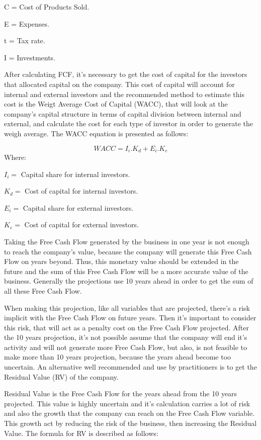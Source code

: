 \documentclass[
  11pt,
  a4paper,
]{article}
\begin{document}
C = Cost of Products Sold.

E = Expenses.

t = Tax rate.

I = Investments.

After calculating FCF, it's necessary to get the cost of capital for the investors that allocated capital on the company. This cost of capital will account for internal and external investors and the recommended method to estimate this cost is the Weigt Average Cost of Capital (WACC), that will look at the company's capital structure in terms of capital division between internal and external, and calculate the cost for each type of investor in order to generate the weigh average. The WACC equation is presented as follows:

\[WACC = I_i.K_d + E_i.K_e\]
Where:

\(I_i =\) Capital share for internal investors.

\(K_d =\) Cost of capital for internal investors.

\(E_i =\) Capital share for external investors.

\(K_e =\) Cost of capital for external investors.

Taking the Free Cash Flow generated by the business in one year is not enough to reach the company's value, because the company will generate this Free Cash Flow on years beyond. Thus, this monetary value should be extended in the future and the sum of this Free Cash Flow will be a more accurate value of the business. Generally the projections use 10 years ahead in order to get the sum of all these Free Cash Flow.

When making this projection, like all variables that are projected, there's a risk implicit with the Free Cash Flow on future years. Then it's important to consider this risk, that will act as a penalty cost on the Free Cash Flow projected. After the 10 years projection, it's not possible assume that the company will end it's activity and will not generate more Free Cash Flow, but also, is not feasible to make more than 10 years projection, because the years ahead become too uncertain. An alternative well recommended and use by practitioners is to get the Residual Value (RV) of the company.

Residual Value is the Free Cash Flow for the years ahead from the 10 years projected. This value is highly uncertain and it's calculation carries a lot of risk and also the growth that the company can reach on the Free Cash Flow variable. This growth act by reducing the risk of the business, then increasing the Residual Value. The formula for RV is described as follows:
\end{document}
